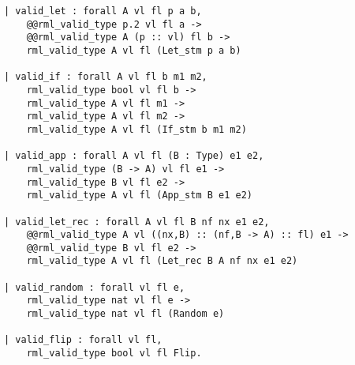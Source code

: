 \documentclass[11pt, leqno, titlepage]{article}
\theoremstyle{definition}
\begin{document}
\begin{appendices}
\begin{lstlisting}[language=coq]
| valid_let : forall A vl fl p a b,
    @@rml_valid_type p.2 vl fl a ->
    @@rml_valid_type A (p :: vl) fl b ->
    rml_valid_type A vl fl (Let_stm p a b)
                   
| valid_if : forall A vl fl b m1 m2,
    rml_valid_type bool vl fl b ->
    rml_valid_type A vl fl m1 ->
    rml_valid_type A vl fl m2 ->
    rml_valid_type A vl fl (If_stm b m1 m2)
                   
| valid_app : forall A vl fl (B : Type) e1 e2,
    rml_valid_type (B -> A) vl fl e1 ->
    rml_valid_type B vl fl e2 ->
    rml_valid_type A vl fl (App_stm B e1 e2)

| valid_let_rec : forall A vl fl B nf nx e1 e2,
    @@rml_valid_type A vl ((nx,B) :: (nf,B -> A) :: fl) e1 ->
    @@rml_valid_type B vl fl e2 ->
    rml_valid_type A vl fl (Let_rec B A nf nx e1 e2)

| valid_random : forall vl fl e,
    rml_valid_type nat vl fl e ->
    rml_valid_type nat vl fl (Random e)

| valid_flip : forall vl fl,
    rml_valid_type bool vl fl Flip.
\end{lstlisting}

\end{appendices}
\end{document}
